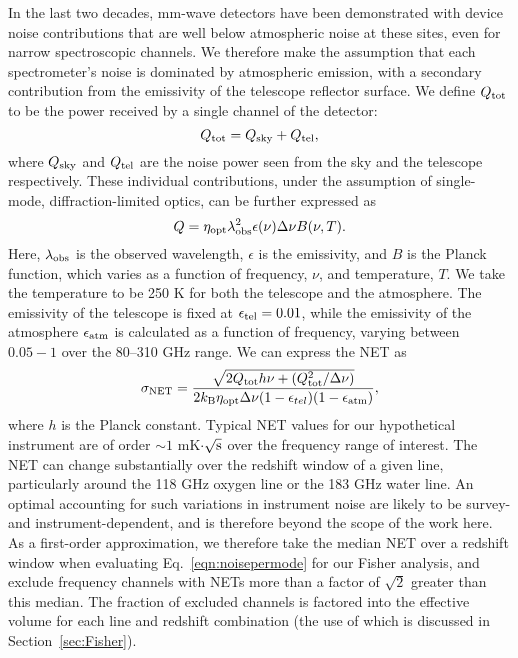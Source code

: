 \documentclass[twocolumn]{aastex631}
\begin{document}
In the last two decades, mm-wave detectors have been demonstrated with device noise contributions that are well below atmospheric noise at these sites, even for narrow spectroscopic channels.  We therefore make the assumption that each spectrometer's noise is dominated by atmospheric emission, with a secondary contribution from the emissivity of the telescope reflector surface. We define $Q_{\rm tot}$ to be the power received by a single channel of the detector:
\begin{equation}
    Q_{\rm tot} = Q_{\rm sky} + Q_{\rm tel},
\end{equation}
where $Q_{\rm sky}$ and $Q_{\rm tel}$ are the noise power seen from the sky and the telescope respectively. These individual contributions, under the assumption of single-mode, diffraction-limited optics, can be further expressed as
\begin{equation}\label{eqn:detpower}
    Q = \eta_{\rm opt} \lambda_{\rm obs}^{2} \epsilon(\nu) \Delta\nu  B(\nu, T)   .
\end{equation}
Here, $\lambda_{\rm obs}$ is the observed wavelength, $\epsilon$ is the emissivity, and $B$ is the Planck function, which varies as a function of frequency, $\nu$, and temperature, $T$. We take the temperature to be 250 K for both the telescope and the atmosphere. The emissivity of the telescope is fixed at $\epsilon_{\rm tel}=0.01$, while the emissivity of the atmosphere $\epsilon_{\rm atm}$ is calculated as a function of frequency, varying between $0.05-1$ over the 80--310 GHz range. We can  express the NET as
\begin{equation}\label{eqn:sigma_net}
    \sigma_{\rm NET} =
    \frac{\sqrt{2Q_{\rm tot} h \nu + (Q^{2}_{\rm tot} / \Delta\nu)}}
    {2k_{\rm B}\eta_{\rm opt}\Delta\nu (1-\epsilon_{tel})(1-\epsilon_{\rm atm})},
\end{equation}
where $h$ is the Planck constant. Typical NET values for our hypothetical instrument are of order ${\sim} 1$ mK$\cdot\sqrt{\rm s}$ over the frequency range of interest. The NET can change substantially over the redshift window of a given line, particularly around the 118 GHz oxygen line or the 183 GHz water line. An optimal accounting for such variations in instrument noise are likely to be survey- and instrument-dependent, and is therefore beyond the scope of the work here. As a first-order approximation, we therefore take the median NET over a redshift window when evaluating Eq.~\eqref{eqn:noisepermode} for our Fisher analysis, and exclude frequency channels with NETs more than a factor of $\sqrt{2}$ greater than this median. The fraction of excluded channels is factored into the effective volume for each line and redshift combination (the use of which is discussed in Section~\ref{sec:Fisher}). 
\end{document}
